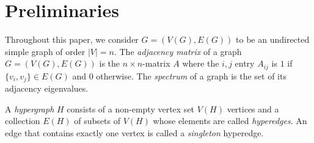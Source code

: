 \documentclass[12pt]{article}
\theoremstyle{plain}
\theoremstyle{definition}
\theoremstyle{remark}
\begin{document}
\section{Preliminaries}\label{sec:preliminaries}

Throughout this paper, we consider $G=(V(G),E(G))$ to be an undirected simple graph of order $|V|=n$. The \textit{adjacency matrix} of a graph $G=(V(G),E(G))$ is the $n\times n$-matrix $A$ where the $i,j$ entry $A_{ij}$ is $1$ if $\{v_i,v_j\}\in E(G)$ and $0$ otherwise. The \textit{spectrum} of a graph is the set of its adjacency eigenvalues. 



 

A \textit{hypergraph} $H$ consists of a non-empty vertex set $V(H)$ vertices and a collection $E(H)$ of subsets of $V(H)$ whose elements are called \textit{hyperedges}.
An edge that contains exactly one vertex is called a \textit{singleton} hyperedge.
\end{document}
